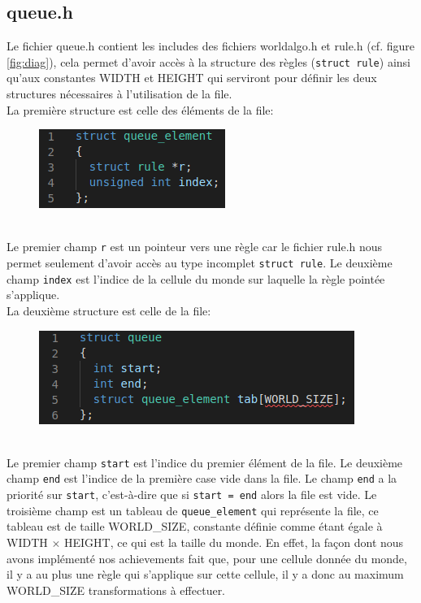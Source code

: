 \documentclass[a4paper]{article}
\begin{document}
\subsection{queue.h}
Le fichier queue.h contient les includes des fichiers worldalgo.h et rule.h (cf. figure \ref{fig:diag}), cela permet d'avoir accès à la structure des règles (\texttt{struct rule}) ainsi qu'aux constantes {\small WIDTH} et {\small HEIGHT} qui serviront pour définir les deux structures nécessaires à l'utilisation de la file.
\\\indent La première structure est celle des éléments de la file:
\begin{figure}[htb]
    \centering
    \includegraphics[scale=0.8]{img/queue_element.png}
\end{figure}
\\\indent Le premier champ \texttt{r} est un pointeur vers une règle car le fichier rule.h nous permet seulement d'avoir accès au type incomplet \texttt{struct rule}. Le deuxième champ \texttt{index} est l'indice de la cellule du monde sur laquelle la règle pointée s'applique.
\\\indent La deuxième structure est celle de la file:
\begin{figure}[h]
    \centering
    \includegraphics[scale=0.8]{img/queue.png}
\end{figure}
\\\indent Le premier champ \texttt{start} est l'indice du premier élément de la file. Le deuxième champ \texttt{end} est l'indice de la première case vide dans la file. Le champ \texttt{end} a la priorité sur \texttt{start}, c'est-à-dire que si \texttt{start = end} alors la file est vide. Le troisième champ est un tableau de \texttt{queue\_element} qui représente la file, ce tableau est de taille {\small WORLD\_SIZE}, constante définie comme étant égale à {\small WIDTH $\times$ HEIGHT}, ce qui est la taille du monde. En effet, la façon dont nous avons implémenté nos achievements fait que, pour une cellule donnée du monde, il y a au plus une règle qui s'applique sur cette cellule, il y a donc au maximum {\small WORLD\_SIZE} transformations à effectuer.
\end{document}

